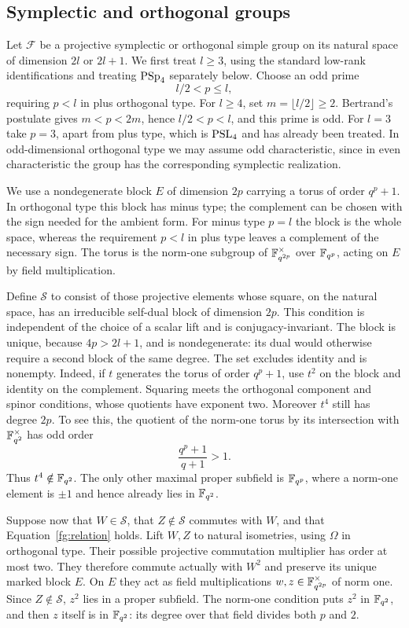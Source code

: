 \subsection{Symplectic and orthogonal groups}

Let $\mathcal F$ be a projective symplectic or orthogonal simple group
on its natural space of dimension $2l$ or $2l+1$. We first treat
$l\ge3$, using the standard low-rank identifications and treating
$\operatorname{PSp}_4$ separately below. Choose an odd prime
\begin{equation}\label{fg:block-prime}
 l/2<p\le l,
\end{equation}
requiring $p<l$ in plus orthogonal type. For $l\ge4$, set
$m=\lfloor l/2\rfloor\ge2$. Bertrand's postulate gives
$m<p<2m$, hence $l/2<p<l$, and this prime is odd.
For $l=3$ take $p=3$, apart from plus type, which is $\operatorname{PSL}_4$ and
has already been treated. In odd-dimensional orthogonal type we may
assume odd characteristic, since in even characteristic the group
has the corresponding symplectic realization.

We use a nondegenerate block $E$ of dimension $2p$ carrying a torus
of order $q^p+1$. In orthogonal type this block has minus type; the
complement can be chosen with the sign needed for the ambient form.
For minus type $p=l$ the block is the whole space, whereas the
requirement $p<l$ in plus type leaves a complement of the necessary
sign. The torus is the norm-one subgroup of
$\mathbb F_{q^{2p}}^\times$ over $\mathbb F_{q^p}$, acting on $E$ by field
multiplication.

Define $\mathcal S$ to consist of those projective elements whose
square, on the natural space, has an irreducible self-dual block of
dimension $2p$. This condition is independent of the choice of a
scalar lift and is conjugacy-invariant. The block is unique, because
$4p>2l+1$, and is nondegenerate: its dual would otherwise require a
second block of the same degree. The set excludes identity and is
nonempty. Indeed, if $t$ generates the torus of order $q^p+1$, use
$t^2$ on the block and identity on the complement. Squaring meets
the orthogonal component and spinor conditions, whose quotients
have exponent two. Moreover $t^4$ still has degree $2p$. To see
this, the quotient of the norm-one torus by its intersection with
$\mathbb F_{q^2}^{\times}$ has odd order
\[
 \frac{q^p+1}{q+1}>1.
\]
Thus $t^4\notin\mathbb F_{q^2}$. The only other maximal proper subfield
is $\mathbb F_{q^p}$, where a norm-one element is $\pm1$ and hence already
lies in $\mathbb F_{q^2}$.

Suppose now that $W\in\mathcal S$, that $Z\notin\mathcal S$
commutes with $W$, and that Equation~\eqref{fg:relation} holds.
Lift $W,Z$ to natural isometries, using $\Omega$ in orthogonal type.
Their possible projective commutation multiplier has order at most
two. They therefore commute actually with $W^2$ and preserve its
unique marked block $E$. On $E$ they act as field multiplications
$w,z\in\mathbb F_{q^{2p}}^\times$ of norm one. Since $Z\notin\mathcal S$,
$z^2$ lies in a proper subfield. The norm-one condition puts $z^2$
in $\mathbb F_{q^2}$, and then $z$ itself is in $\mathbb F_{q^2}$: its degree
over that field divides both $p$ and $2$.

